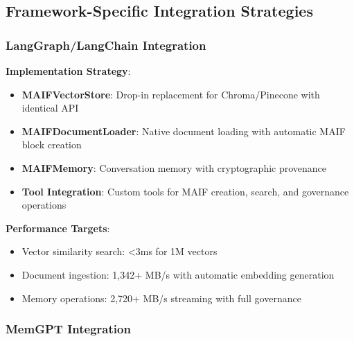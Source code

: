 \documentclass[conference]{IEEEtran}
\begin{document}

\subsection{Framework-Specific Integration Strategies}

\subsubsection{LangGraph/LangChain Integration}

\textbf{Implementation Strategy}:
\begin{itemize}[leftmargin=*]
\item \textbf{MAIFVectorStore}: Drop-in replacement for Chroma/Pinecone with identical API
\item \textbf{MAIFDocumentLoader}: Native document loading with automatic MAIF block creation
\item \textbf{MAIFMemory}: Conversation memory with cryptographic provenance
\item \textbf{Tool Integration}: Custom tools for MAIF creation, search, and governance operations
\end{itemize}

\textbf{Performance Targets}:
\begin{itemize}[leftmargin=*]
\item Vector similarity search: <3ms for 1M vectors
\item Document ingestion: 1,342+ MB/s with automatic embedding generation
\item Memory operations: 2,720+ MB/s streaming with full governance
\end{itemize}

\subsubsection{MemGPT Integration}
\end{document}
